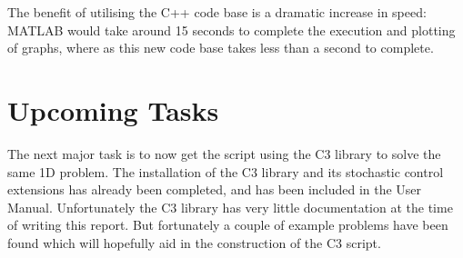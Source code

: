 \documentclass[11pt,draftd]{article}
\begin{document}
\noindent The benefit of utilising the C++ code base is a dramatic increase in speed: MATLAB would take around 15 seconds to complete the execution and plotting of graphs, where as this new code base takes less than a second to complete.
\newpage

\section{Upcoming Tasks}
The next major task is to now get the script using the C3 library to solve the same 1D problem. The installation of the C3 library and its stochastic control extensions has already been completed, and has been included in the User Manual. Unfortunately the C3 library has very little documentation at the time of writing this report. But fortunately a couple of example problems have been found which will hopefully aid in the construction of the C3 script.

\newpage 
\end{document}
